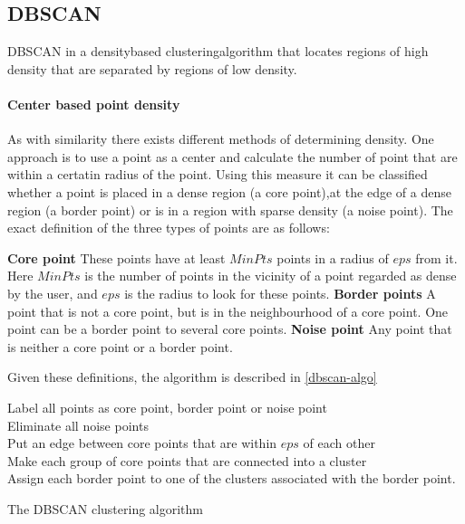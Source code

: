 
\subsection{DBSCAN}
DBSCAN in a densitybased clusteringalgorithm that locates regions of high density that are separated by regions of low density.

\paragraph{Center based point density}
As with similarity there exists different methods of determining density.
One approach is to use a point as a center and calculate the number of point that are within a certatin radius of the point.
Using this measure it can be classified whether a point is placed in a dense region (a core point),at the edge of a dense region (a border point) or is in a region with sparse density (a noise point).
The exact definition of the three types of points are as follows:

\textbf{Core point} These points have at least $ MinPts $ points in a radius of $ eps $ from it. 
Here $ MinPts $ is the number of points in the vicinity of a point regarded as dense by the user, and $ eps $ is the radius to look for these points.
\textbf{Border points} A point that is not a core point, but is in the neighbourhood of a core point. 
One point can be a border point to several core points.
\textbf{Noise point} Any point that is neither a core point or a border point.

Given these definitions, the algorithm is described in \cref{dbscan-algo}

\begin{algorithm}
Label all points as core point, border point or noise point \\
Eliminate all noise points \\
Put an edge between core points that are within $ eps $ of each other \\
Make each group of core points that are connected into a cluster \\
Assign each border point to one of the clusters associated with the border point. 
\caption{The DBSCAN clustering algorithm}\label{dbscan-algo}
\end{algorithm}

